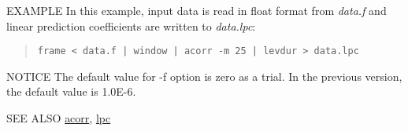 \begin{options}
\end{options}

\begin{qsection}{EXAMPLE}
In this example, input data is read in float format from
{\em data.f} and linear prediction coefficients are written
to {\em data.lpc}:
\begin{quote}
 \verb!frame < data.f | window | acorr -m 25 | levdur > data.lpc!
\end{quote} 
\end{qsection}

\begin{qsection}{NOTICE}
The default value for -f option is zero as a trial. In the previous version, the 
default value is 1.0E-6.
\end{qsection}

\begin{qsection}{SEE ALSO}
\hyperlink{acorr}{acorr},
\hyperlink{lpc}{lpc}
\end{qsection}
